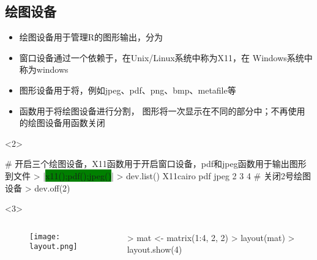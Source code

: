 \subsection{绘图设备}
\begin{frame}[t, fragile]{\subsecname}{}
  \begin{itemize}
  \item<1-> 绘图设备用于管理R的图形输出，分为
  \item<2-> 窗口设备通过一个依赖于，在Unix/Linux系统中称为X11，在
        Windows系统中称为windows
  \item<2-> 图形设备用于将，例如jpeg、pdf、png、bmp、metafile等
  \item<3-> 函数用于将绘图设备进行分割，
            图形将一次显示在不同的部分中；不再使用的绘图设备用函数关闭 
  \end{itemize} 

\begin{overlayarea}{\textwidth}{\textheight}
\begin{onlyenv}<2>
\begin{rcode}
# 开启三个绘图设备，X11函数用于开启窗口设备，pdf和jpeg函数用于输出图形到文件
> |\colorbox{green}{x11();pdf();jpeg()}|
> dev.list()
X11cairo      pdf     jpeg 
       2        3        4 
# 关闭2号绘图设备
> dev.off(2) 
\end{rcode}  
\end{onlyenv}

\begin{onlyenv}<3>
      \begin{columns}
        \begin{column}{.4\textwidth}
          \begin{figure}
            \centering
            \texttt{[image: layout.png]}
          \end{figure}
        \end{column}

        \begin{column}{.6\textwidth}
 \centering
\begin{rcode}
> mat <- matrix(1:4, 2, 2)
> layout(mat)
> layout.show(4)
\end{rcode}
        \end{column}
      \end{columns}
\end{onlyenv}


\end{overlayarea}
\end{frame}
